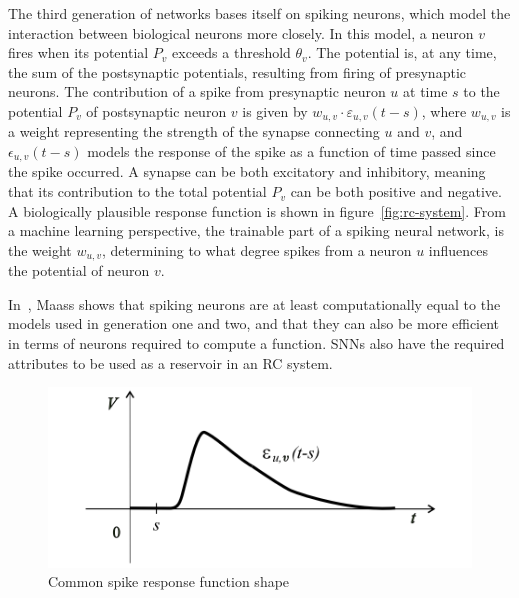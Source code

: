 The third generation of networks bases itself on spiking neurons, which model the interaction between biological neurons more closely.
In this model, a neuron $v$ fires when its potential $P_v$ exceeds a threshold $\theta_v$.
The potential is, at any time, the sum of the postsynaptic potentials, resulting from firing of presynaptic neurons.
The contribution of a spike from presynaptic neuron $u$ at time $s$ to the potential $P_v$ of postsynaptic neuron $v$ is given by $w_{u,v} \cdot \varepsilon_{u,v}(t-s)$, where $w_{u,v}$ is a weight representing the strength of the synapse connecting $u$ and $v$, and $\epsilon_{u,v}(t-s)$ models the response of the spike as a function of time passed since the spike occurred.
A synapse can be both excitatory and inhibitory, meaning that its contribution to the total potential $P_v$ can be both positive and negative.
A biologically plausible response function is shown in figure~\ref{fig:rc-system}.
From a machine learning perspective, the trainable part of a spiking neural network, is the weight $w_{u,v}$, determining to what degree spikes from a neuron $u$ influences the potential of neuron $v$.


In~\cite{Maass1997}, Maass shows that spiking neurons are at least computationally equal to the models used in generation one and two, and that they can also be more efficient in terms of neurons required to compute a function.
SNNs also have the required attributes to be used as a reservoir in an RC system.~\cite{Pipa2010}

\begin{figure}
  \centering
  \includegraphics[width=\linewidth]{figures/response-function-snn}
  \caption{Common spike response function shape}
\label{fig:response-function-snn}
\end{figure}

